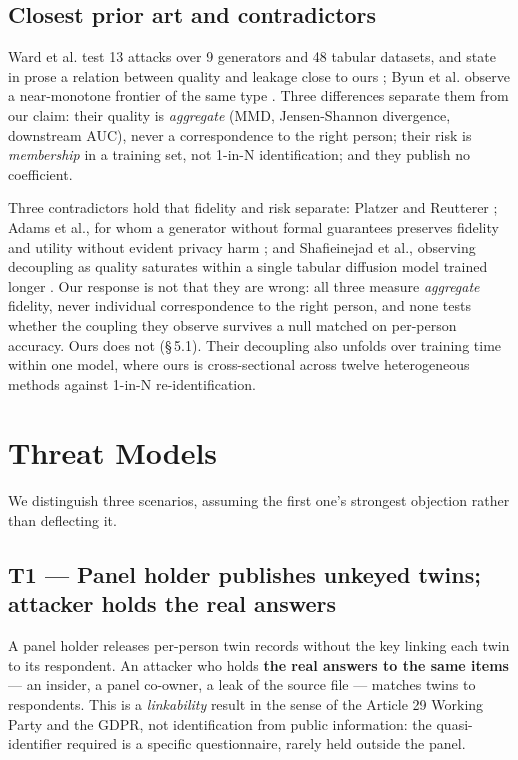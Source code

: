 \documentclass[sigconf,anonymous,review]{acmart}
\begin{document}
\subsection{Closest prior art and contradictors}

Ward et al. test 13 attacks over 9 generators and 48 tabular datasets, and state in prose a relation between quality and leakage close to ours \cite{ward2025synthmia}; Byun et al. observe a near-monotone frontier of the same type \cite{byun2025riskcontext}. Three differences separate them from our claim: their quality is \textit{aggregate} (MMD, Jensen-Shannon divergence, downstream AUC), never a correspondence to the right person; their risk is \textit{membership} in a training set, not 1-in-N identification; and they publish no coefficient.

Three contradictors hold that fidelity and risk separate: Platzer and Reutterer \cite{platzer2021holdout}; Adams et al., for whom a generator without formal guarantees preserves fidelity and utility without evident privacy harm \cite{adams2025fidelity}; and Shafieinejad et al., observing decoupling as quality saturates within a single tabular diffusion model trained longer \cite{shafieinejad2026diffusion}. Our response is not that they are wrong: all three measure \textit{aggregate} fidelity, never individual correspondence to the right person, and none tests whether the coupling they observe survives a null matched on per-person accuracy. Ours does not (\S\,5.1). Their decoupling also unfolds over training time within one model, where ours is cross-sectional across twelve heterogeneous methods against 1-in-N re-identification.

\section{Threat Models}

We distinguish three scenarios, assuming the first one's strongest objection rather than deflecting it.

\subsection{T1 --- Panel holder publishes unkeyed twins; attacker holds the real answers}

A panel holder releases per-person twin records without the key linking each twin to its respondent. An attacker who holds \textbf{the real answers to the same items} --- an insider, a panel co-owner, a leak of the source file --- matches twins to respondents. This is a \textit{linkability} result in the sense of the Article 29 Working Party and the GDPR, not identification from public information: the quasi-identifier required is a specific questionnaire, rarely held outside the panel.
\end{document}
